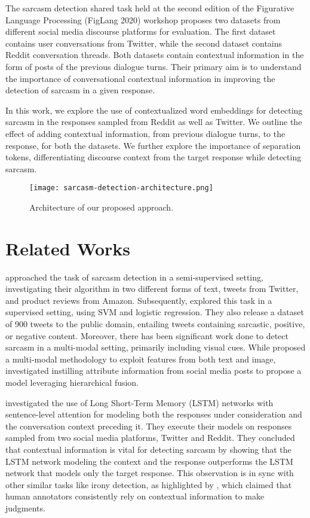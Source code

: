 \documentclass[11pt,a4paper]{article}
\begin{document}
The sarcasm detection shared task held at the second edition of the Figurative Language Processing (FigLang 2020) workshop proposes two datasets from different social media discourse platforms for evaluation. The first dataset contains user conversations from Twitter, while the second dataset contains Reddit conversation threads. Both datasets contain contextual information in the form of posts of the previous dialogue turns. Their primary aim is to understand the importance of conversational contextual information in improving the detection of sarcasm in a given response.

In this work, we explore the use of contextualized word embeddings for detecting sarcasm in the responses sampled from Reddit as well as Twitter. We outline the effect of adding contextual information, from previous dialogue turns, to the response, for both the datasets. We further explore the importance of separation tokens, differentiating discourse context from the target response while detecting sarcasm. 

\begin{figure*}[!h]
        \centering
        \texttt{[image: sarcasm-detection-architecture.png]}
        \caption{Architecture of our proposed approach.}
\end{figure*}

\section{Related Works}
\citet{davidov-etal-2010-semi} approached the task of sarcasm detection in a semi-supervised setting, investigating their algorithm in two different forms of text, tweets from Twitter, and product reviews from Amazon. Subsequently, \citet{gonzalez-ibanez-etal-2011-identifying} explored this task in a supervised setting, using SVM and logistic regression. They also release a dataset of 900 tweets to the public domain, entailing tweets containing sarcastic, positive, or negative content. Moreover, there has been significant work done to detect sarcasm in a multi-modal setting, primarily including visual cues. While \citet{Schifanella2016} proposed a multi-modal methodology to exploit features from both text and image, \citet{CaiSarcasm2019} investigated instilling attribute information from social media posts to propose a model leveraging hierarchical fusion.

\citet{Ghosh2018} investigated the use of Long Short-Term Memory (LSTM) networks with sentence-level attention for modeling both the responses under consideration and the conversation context preceding it. They execute their models on responses sampled from two social media platforms, Twitter and Reddit. They concluded that contextual information is vital for detecting sarcasm by showing that the LSTM network modeling the context and the response outperforms the LSTM network that models only the target response. This observation is in sync with other similar tasks like irony detection, as highlighted by \citet{Wallace2014HumansRC}, which claimed that human annotators consistently rely on contextual information to make judgments. 
\end{document}

